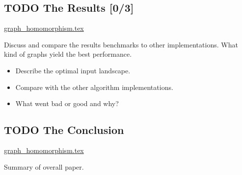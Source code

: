 \documentclass[11pt]{article}
\begin{document}
\subsection{{\bfseries\sffamily TODO} The Results [0/3]}
\label{sec:org1ce0691}
\url{graph\_homomorphism.tex}

Discuss and compare the results benchmarks to other implementations. What kind of graphs yield the best performance.

\begin{itemize}
\item[{$\square$}] Describe the optimal input landscape.
\item[{$\square$}] Compare with the other algorithm implementations.
\item[{$\square$}] What went bad or good and why?
\end{itemize}
\subsection{{\bfseries\sffamily TODO} The Conclusion}
\label{sec:org7f66cb9}
\url{graph\_homomorphism.tex}

Summary of overall paper.
\end{document}
